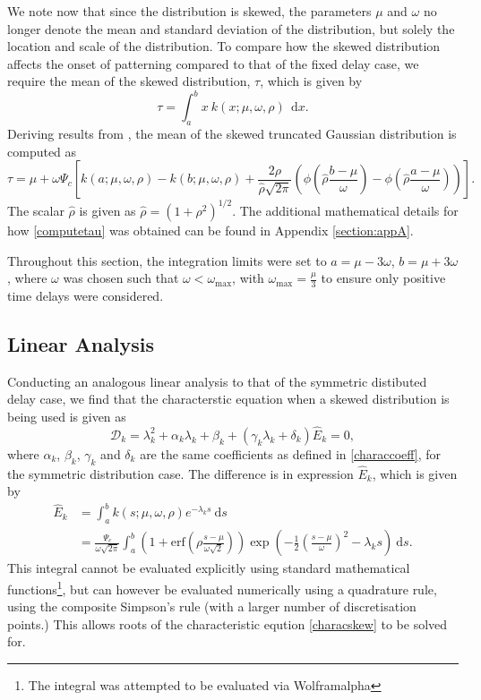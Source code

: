 We note now that since the distribution is skewed, the parameters $\mu$ and $\omega$ no longer denote the mean and standard deviation of the distribution, but solely the location and scale of the distribution. To compare how the skewed distribution affects the onset of patterning compared to that of the fixed delay case, we require the mean of the skewed distribution, $\tau$, which is given by
\begin{equation}\label{anmean}
    \tau=\int_a^bx\ k(x;\mu,\omega,\rho)\ \ \text{d}x.
\end{equation}
Deriving results from \cite{skewed}, the mean of the skewed truncated Gaussian distribution is computed as
\begin{equation}\label{computetau}
\tau=\mu+\omega\Psi_c\left[k(a;\mu,\omega,\rho)-k(b;\mu,\omega,\rho)+\frac{2\rho}{\hat{\rho}\sqrt{2\pi}}\left(\phi\left(\hat{\rho}\frac{b-\mu}{\omega}\right)-\phi\left(\hat{\rho}\frac{a-\mu}{\omega}\right)\right)\right].
\end{equation}
The scalar $\hat{\rho}$ is given as $\hat{\rho}=\left(1+\rho^2\right)^{1/2}$. The additional mathematical details for how \eqref{computetau} was obtained can be found in Appendix \ref{section:appA}.

Throughout this section, the integration limits were set to $a=\mu-3\omega$, $b=\mu+3\omega$, where $\omega$ was chosen such that $\omega<\omega_{\max}$, with $\omega_{\max}=\frac{\mu}{3}$ to ensure only positive time delays were considered.
\subsection{Linear Analysis}\label{section:linanalskew}
Conducting an analogous linear analysis to that of the symmetric distibuted delay case, we find that the characterstic equation when a skewed distribution is being used is given as
\begin{equation}\label{characskew}
  \mathcal{D}_k=\lambda_k^2+\alpha_k\lambda_k+\beta_k+(\gamma_k\lambda_k+\delta_k)\hat{E}_k=0,
\end{equation}
where $\alpha_k$, $\beta_k$, $\gamma_k$ and $\delta_k$ are the same coefficients as defined in \eqref{characcoeff}, for the symmetric distribution case. The difference is in expression $\hat{E}_k$, which is given by
\begin{equation}\label{Ehat}
    \begin{split}
\hat{E}_k&=\int_a^bk(s;\mu,\omega,\rho)e^{-\lambda_k s}\ \text{d}s\\
&=\frac{\Psi_c}{\omega\sqrt{2\pi}}\int_a^b\left(1+\text{erf}\left(\rho\frac{s-\mu}{\omega\sqrt{2}}\right)\right)\exp\left(-\frac{1}{2}\left(\frac{s-\mu}{\omega}\right)^2-\lambda_ks\right)\ \text{d}s.
    \end{split}
\end{equation}
This integral cannot be evaluated explicitly using standard mathematical functions\footnote{The integral was attempted to be evaluated via Wolframalpha}, but can however be evaluated numerically using a quadrature rule, using the composite Simpson's rule (with a larger number of discretisation points.) This allows roots of the characteristic eqution \eqref{characskew} to be solved for.

